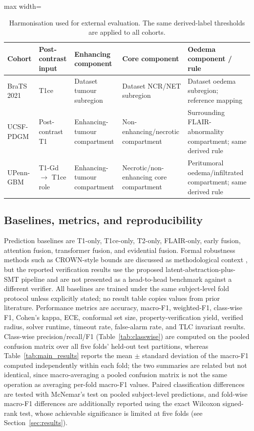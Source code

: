 \documentclass[preprint,11pt]{elsarticle}
\begin{document}
\begin{table}[H]
\centering
\caption{Harmonisation used for external evaluation. The same derived-label thresholds are applied to all cohorts.}
\label{tab:external_mapping}
\scriptsize
\begin{adjustbox}{max width=\textwidth}
\begin{tabular}{p{2.2cm}p{3.0cm}p{3.0cm}p{3.0cm}p{3.2cm}}
\toprule
\textbf{Cohort} & \textbf{Post-contrast input} & \textbf{Enhancing component} & \textbf{Core component} & \textbf{Oedema component / rule} \\
\midrule
BraTS 2021 & T1ce & Dataset tumour subregion & Dataset NCR/NET subregion & Dataset oedema subregion; reference mapping \\
UCSF-PDGM & Post-contrast T1 & Enhancing-tumour compartment & Non-enhancing/necrotic compartment & Surrounding FLAIR-abnormality compartment; same derived rule \\
UPenn-GBM & T1-Gd $\rightarrow$ T1ce role & Enhancing-tumour compartment & Necrotic/non-enhancing core compartment & Peritumoral oedema/infiltrated compartment; same derived rule \\
\bottomrule
\end{tabular}
\end{adjustbox}
\end{table}

\subsection{Baselines, metrics, and reproducibility}

Prediction baselines are T1-only, T1ce-only, T2-only, FLAIR-only, early fusion, attention fusion, transformer fusion, and evidential fusion. Formal robustness methods such as CROWN-style bounds are discussed as methodological context \cite{zhang2018efficient}, but the reported verification results use the proposed latent-abstraction-plus-SMT pipeline and are not presented as a head-to-head benchmark against a different verifier. All baselines are trained under the same subject-level fold protocol unless explicitly stated; no result table copies values from prior literature. Performance metrics are accuracy, macro-F1, weighted-F1, class-wise F1, Cohen's kappa, ECE, conformal set size, property-verification yield, verified radius, solver runtime, timeout rate, false-alarm rate, and TLC invariant results. Class-wise precision/recall/F1 (Table~\ref{tab:classwise}) are computed on the pooled confusion matrix over all five folds' held-out test partitions, whereas Table~\ref{tab:main_results} reports the mean $\pm$ standard deviation of the macro-F1 computed independently within each fold; the two summaries are related but not identical, since macro-averaging a pooled confusion matrix is not the same operation as averaging per-fold macro-F1 values. Paired classification differences are tested with McNemar's test on pooled subject-level predictions, and fold-wise macro-F1 differences are additionally reported using the exact Wilcoxon signed-rank test, whose achievable significance is limited at five folds (see Section~\ref{sec:results}).
\end{document}
